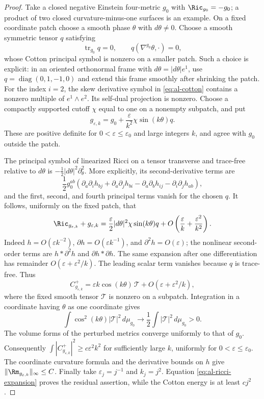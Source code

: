 \begin{proof}
Take a closed negative Einstein four-metric $g_0$ with $\Ric_{g_0}=-g_0$;
a product of two closed curvature-minus-one surfaces is an example.
On a fixed coordinate patch choose a smooth phase $\theta$ with
$d\theta\ne0$.  Choose a smooth symmetric tensor $q$ satisfying
\[
 \operatorname{tr}_{g_0}q=0,
 \qquad q(\nabla^{g_0}\theta,\cdot)=0,
\]
whose Cotton principal symbol is nonzero on a smaller patch.  Such a
choice is explicit: in an oriented orthonormal frame with
$d\theta=|d\theta|e^1$, use $q=\operatorname{diag}(0,1,-1,0)$ and
extend this frame smoothly after shrinking the patch.  For the index
$i=2$, the skew derivative symbol in \eqref{eq:al-cotton} contains a
nonzero multiple of $e^1\wedge e^2$.  Its self-dual projection is nonzero.
Choose a compactly supported cutoff $\chi$ equal to one on a nonempty
subpatch, and put
\[
 g_{\varepsilon,k}
 =g_0+\frac{\varepsilon}{k^2}\chi\sin(k\theta)q.
\]
These are positive definite for $0<\varepsilon\le\varepsilon_0$ and
large integers $k$, and agree with $g_0$ outside the patch.

The principal symbol of linearized Ricci on a tensor transverse and
trace-free relative to $d\theta$ is $-\tfrac12|d\theta|^2\partial_\theta^2$.
More explicitly, its second-derivative terms are
\[
 \frac12g_0^{ab}
 (\partial_a\partial_i h_{bj}+\partial_a\partial_j h_{bi}
 -\partial_a\partial_b h_{ij}-\partial_i\partial_j h_{ab}),
\]
and the first, second, and fourth principal terms vanish for the chosen
$q$.  It follows, uniformly on the fixed patch, that
\begin{equation}\label{eq:al-ricci-expansion}
 \Ric_{g_{\varepsilon,k}}+g_{\varepsilon,k}
 =\frac\varepsilon2|d\theta|^2\chi\sin(k\theta)q
 +O\left(\frac\varepsilon k+\frac{\varepsilon^2}{k^2}\right).
\end{equation}
Indeed $h=O(\varepsilon k^{-2})$, $\partial h=O(\varepsilon k^{-1})$,
and $\partial^2h=O(\varepsilon)$; the nonlinear second-order terms are
$h*\partial^2h$ and $\partial h*\partial h$.  The same expansion after
one differentiation has remainder $O(\varepsilon+\varepsilon^2/k)$.
The leading scalar term vanishes because $q$ is trace-free.  Thus
\[
 C^+_{g_{\varepsilon,k}}
 =\varepsilon k\cos(k\theta)\,\mathcal T
 +O(\varepsilon+\varepsilon^2/k),
\]
where the fixed smooth tensor $\mathcal T$ is nonzero on a subpatch.
Integration in a coordinate having $\theta$ as one coordinate gives
\[
 \int\cos^2(k\theta)|\mathcal T|^2\,d\mu_{g_0}
 \longrightarrow\frac12\int|\mathcal T|^2\,d\mu_{g_0}>0.
\]
The volume forms of the perturbed metrics converge uniformly to that of
$g_0$.  Consequently
$\int|C^+_{g_{\varepsilon,k}}|^2\ge c\varepsilon^2k^2$ for sufficiently
large $k$, uniformly for $0<\varepsilon\le\varepsilon_0$.
The coordinate curvature formula and the derivative bounds on $h$ give
$\|\Rm_{g_{\varepsilon,k}}\|_\infty\le C$.  Finally take
$\varepsilon_j=j^{-1}$ and $k_j=j^2$.  Equation
\eqref{eq:al-ricci-expansion} proves the residual assertion, while the
Cotton energy is at least $cj^2$.
\end{proof}

